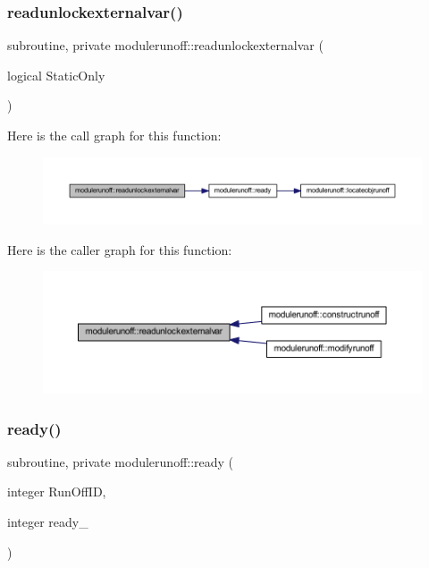 \subsubsection{\texorpdfstring{readunlockexternalvar()}{readunlockexternalvar()}}
{\footnotesize\ttfamily subroutine, private modulerunoff\+::readunlockexternalvar (\begin{DoxyParamCaption}\item[{logical}]{Static\+Only }\end{DoxyParamCaption})\hspace{0.3cm}{\ttfamily [private]}}

Here is the call graph for this function\+:\nopagebreak
\begin{figure}[H]
\begin{center}
\leavevmode
\includegraphics[width=350pt]{namespacemodulerunoff_a900316fc0130b378405b9b03d84eb9cd_cgraph}
\end{center}
\end{figure}
Here is the caller graph for this function\+:\nopagebreak
\begin{figure}[H]
\begin{center}
\leavevmode
\includegraphics[width=350pt]{namespacemodulerunoff_a900316fc0130b378405b9b03d84eb9cd_icgraph}
\end{center}
\end{figure}
\mbox{\label{namespacemodulerunoff_aee0c5b22d517afda2e934847c9da42cb}} 
\subsubsection{\texorpdfstring{ready()}{ready()}}
{\footnotesize\ttfamily subroutine, private modulerunoff\+::ready (\begin{DoxyParamCaption}\item[{integer}]{Run\+Off\+ID,  }\item[{integer}]{ready\+\_\+ }\end{DoxyParamCaption})\hspace{0.3cm}{\ttfamily [private]}}

